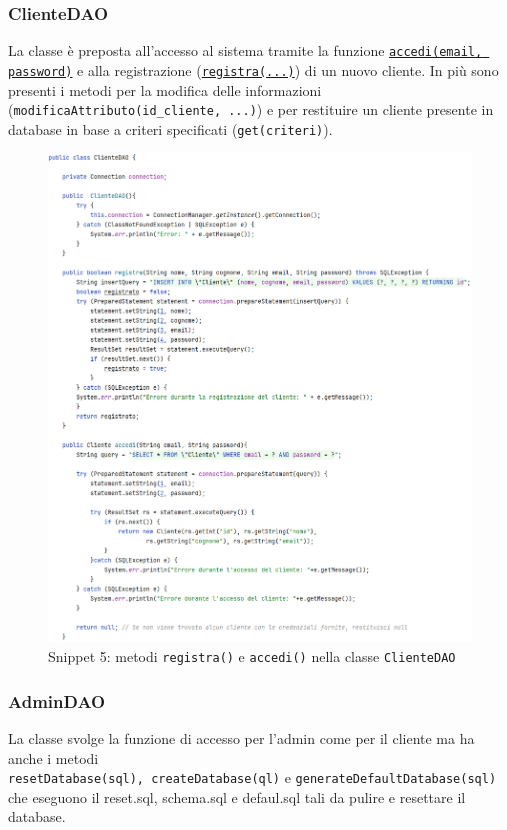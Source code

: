 \documentclass{article}
\newcommand{\code}[1]{\texttt{#1}}
\begin{document}
\subsubsection{ClienteDAO}
La classe è preposta all'accesso al sistema tramite la funzione \hyperref[fig:snippet_clienteDAO]{\code{accedi(email, password)}} e alla registrazione (\hyperref[fig:snippet_clienteDAO]{\code{registra(...)}}) di un nuovo cliente. In più sono presenti i metodi per la modifica delle informazioni (\code{modificaAttributo(id\_cliente, ...)}) e per restituire un cliente presente in database in base a criteri specificati (\code{get(criteri)}).

\begin{figure}[H]
    \centering
    \includegraphics[scale=0.5]{resources/images/Snippets/snippet_clienteDAO.png}
    \captionsetup{labelformat=empty,labelsep=none}
    \caption{Snippet 5: metodi \code{registra()} e \code{accedi()} nella classe \code{ClienteDAO}}
    \label{fig:snippet_clienteDAO}
\end{figure}

\subsubsection{AdminDAO}
La classe svolge la funzione di accesso per l'admin come per il cliente ma ha anche i metodi   \\ \code{resetDatabase(sql), createDatabase(ql)} e \code{generateDefaultDatabase(sql)} che eseguono il reset.sql, schema.sql e defaul.sql tali da pulire e resettare il database.
\end{document}
